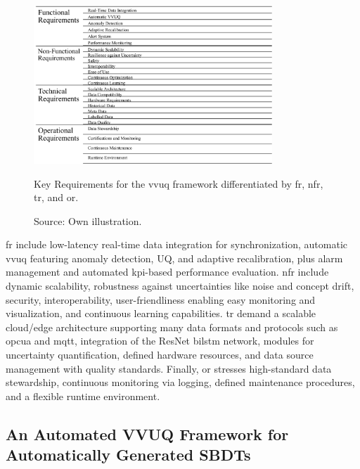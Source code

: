 \begin{figure}[htbp]
  \centering
  \includegraphics[width=0.8\textwidth]{figures/req.png}
  \caption[Key Requirements for VVUQ]{Key Requirements for the \gls{vvuq} framework differentiated by \gls{fr}, \gls{nfr}, \gls{tr}, and \gls{or}. }
  \caption*{Source: Own illustration.}
  \label{fig:requirements}
\end{figure}

\gls{fr} include low-latency real-time data integration for synchronization, automatic \gls{vvuq} featuring anomaly detection, UQ, and adaptive recalibration, plus alarm management and automated \gls{kpi}-based performance evaluation. \gls{nfr} include dynamic scalability, robustness against uncertainties like noise and concept drift, security, interoperability, user-friendliness enabling easy monitoring and visualization, and continuous learning capabilities. \gls{tr} demand a scalable cloud/edge architecture supporting many data formats and protocols such as \gls{opcua} and \gls{mqtt}, integration of the ResNet \gls{bilstm} network, modules for uncertainty quantification, defined hardware resources, and data source management with quality standards. Finally, \gls{or} stresses high-standard data stewardship, continuous monitoring via logging, defined maintenance procedures, and a flexible runtime environment.

\subsection{An Automated VVUQ Framework for Automatically Generated SBDTs}
\label{sec:framework}

